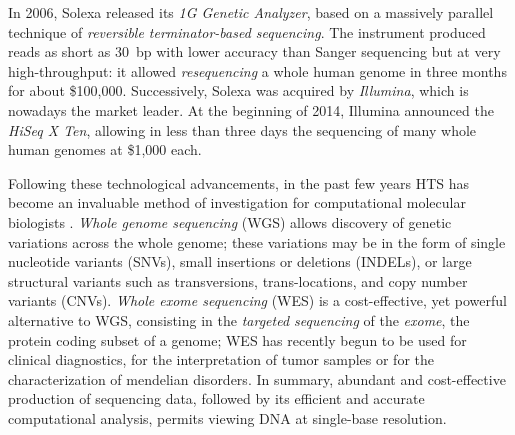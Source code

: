 In 2006, Solexa released its \emph{1G Genetic Analyzer}, based on a massively parallel technique of \emph{reversible terminator-based sequencing}.
The instrument produced reads as short as 30~bp with lower accuracy than Sanger sequencing but at very high-throughput: it allowed \emph{resequencing} a whole human genome in three months for about \$100,000.
Successively, Solexa was acquired by \emph{Illumina}, which is nowadays the market leader.
At the beginning of 2014, Illumina announced the \emph{HiSeq X Ten}, allowing in less than three days the sequencing of many whole human genomes at \$1,000 each.


Following these technological advancements, in the past few years HTS has become an invaluable method of investigation for computational molecular biologists \citep{Mardis2011}.
\emph{Whole genome sequencing} (WGS) allows discovery of genetic variations across the whole genome;
these variations may be in the form of single nucleotide variants (SNVs), small insertions or deletions (INDELs), or large structural variants such as transversions, trans-locations, and copy number variants (CNVs).
\emph{Whole exome sequencing} (WES) is a cost-effective, yet powerful alternative to WGS,
consisting in the \emph{targeted sequencing} of the \emph{exome}, \ie the protein coding subset of a genome;
WES has recently begun to be used for clinical diagnostics, \eg for the interpretation of tumor samples or for the characterization of mendelian disorders.
In summary, abundant and cost-effective production of sequencing data, followed by its efficient and accurate computational analysis, permits viewing DNA at single-base resolution.



